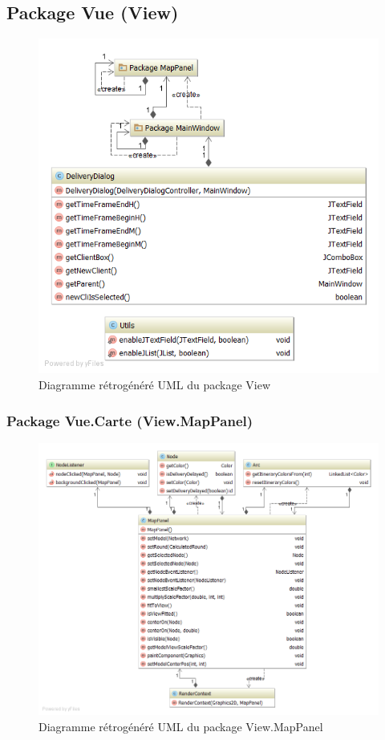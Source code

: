 \subsection{Package Vue (View)}

\begin{figure}[h]
    \centering
    \includegraphics[width=120mm]{../diagrams/classes_packages/final_classes_packages/view/view.png}
    \caption{Diagramme r\'etrog\'en\'er\'e UML du package View}
    \label{diagram:gen_uml_view}
\end{figure}
\pagebreak

\subsubsection{Package Vue.Carte (View.MapPanel)}

\begin{figure}[h]
    \centering
    \includegraphics[width=160mm]{../diagrams/classes_packages/final_classes_packages/view/package_map.png}
    \caption{Diagramme r\'etrog\'en\'er\'e UML du package View.MapPanel}
    \label{diagram:gen_uml_view_map}
\end{figure}
\pagebreak

